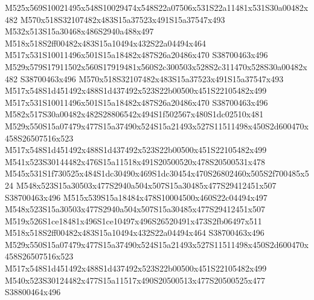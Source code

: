 \documentclass{article}
\begin{document}
\begin{multicols}{2}
M525x569S10021495x548S10029474x548S22a07506x531S22a11481x531S30a00482x482 M570x518S32107482x483S15a37523x491S15a37547x493 M532x513S15a30468x486S2940a488x497 M518x518S2ff00482x483S15a10494x432S22a04494x464 M517x531S10011496x501S15a18482x487S26a20486x470 S38700463x496 M529x579S17911502x560S17919481x560S2c300503x528S2c311470x528S30a00482x482 S38700463x496 M570x518S32107482x483S15a37523x491S15a37547x493 M517x548S1d451492x488S1d437492x523S22b00500x451S22105482x499 M517x531S10011496x501S15a18482x487S26a20486x470 S38700463x496 M582x517S30a00482x482S28806542x494S1f502567x480S1dc02510x481 M529x550S15a07479x477S15a37490x524S15a21493x527S11511498x450S2d600470x458S26507516x523 M517x548S1d451492x488S1d437492x523S22b00500x451S22105482x499 M541x523S30144482x476S15a11518x491S20500520x478S20500531x478 M545x531S1f730525x484S1dc30490x469S1dc30454x470S26802460x505S2f700485x524 M548x523S15a30503x477S2940a504x507S15a30485x477S29412451x507 S38700463x496 M515x539S15a18484x478S10004500x460S22c04494x497 M548x523S15a30503x477S2940a504x507S15a30485x477S29412451x507 M519x526S1ce18481x496S1ce10497x496S26520491x473S2fb06497x511 M518x518S2ff00482x483S15a10494x432S22a04494x464 S38700463x496 M529x550S15a07479x477S15a37490x524S15a21493x527S11511498x450S2d600470x458S26507516x523 M517x548S1d451492x488S1d437492x523S22b00500x451S22105482x499 M540x523S30124482x477S15a11517x490S20500513x477S20500525x477 S38800464x496








\end{multicols}
\end{document}
